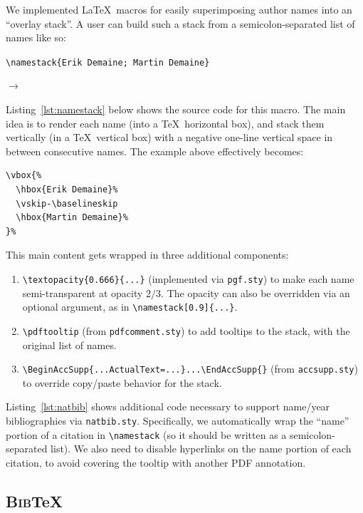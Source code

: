 \documentclass[natbib,authoryear]{sigtbd17-style}
\def\BibTeX{\textsc{Bib}\TeX}
\begin{document}
We implemented \LaTeX\ macros for easily superimposing author names
into an ``overlay stack''.
A user can build such a stack from a semicolon-separated list of names
like so:

\begin{center}
  \lstinline|\namestack{Erik Demaine; Martin Demaine}|

  $\to$ ~
\end{center}

Listing~\ref{lst:namestack} below shows the source code for this macro.
The main idea is to render each name (into a \TeX\ horizontal box),
and stack them vertically (in a \TeX\ vertical box)
with a negative one-line vertical space in between consecutive names.
The example above effectively becomes:

\begin{lstlisting}
\vbox{%
  \hbox{Erik Demaine}%
  \vskip-\baselineskip
  \hbox{Martin Demaine}%
}%
\end{lstlisting}

This main content gets wrapped in three additional components:
%
\begin{enumerate}
\item \lstinline|\textopacity{0.666}{...}| (implemented via \texttt{pgf.sty})
  to make each name semi-transparent at opacity $2/3$.
  The opacity can also be overridden via an optional argument, as in
  \lstinline|\namestack[0.9]{...}|.
\item \lstinline|\pdftooltip| (from \texttt{pdfcomment.sty})
  to add tooltips to the stack, with the original list of names.
\item \lstinline|\BeginAccSupp{...ActualText=...}...\EndAccSupp{}|
  (from \texttt{accsupp.sty}) to override copy/paste behavior for the stack.
\end{enumerate}

Listing~\ref{lst:natbib} shows additional code necessary to support
name/year bibliographies via \texttt{natbib.sty}.  Specifically, we
automatically wrap the ``name'' portion of a citation in
\lstinline|\namestack| (so it should be written as a semicolon-separated list).
We also need to disable hyperlinks on the name portion of each citation,
to avoid covering the tooltip with another PDF annotation.

\subsection{\BibTeX}
\end{document}
